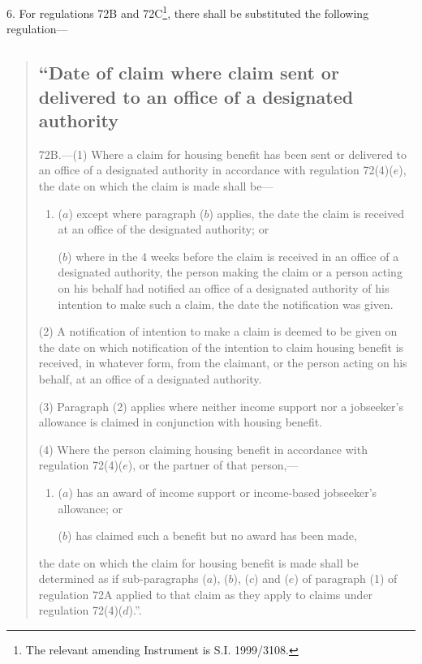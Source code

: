 \documentclass[12pt,a4paper]{article}
\begin{document}
6.  For regulations 72B and 72C\footnote{\frenchspacing The relevant amending Instrument is S.I. 1999/3108.}, there shall be substituted the following regulation—
\begin{quotation}
\subsection*{“Date of claim where claim sent or delivered to an office of a designated authority}

72B.---(1)  Where a claim for housing benefit has been sent or delivered to an office of a designated authority in accordance with regulation 72(4)($e$), the date on which the claim is made shall be—
\begin{enumerate}\item[]
($a$) except where paragraph ($b$)  applies, the date the claim is received at an office of the designated authority; or

($b$) where in the 4 weeks before the claim is received in an office of a designated authority, the person making the claim or a person acting on his behalf had notified an office of a designated authority of his intention to make such a claim, the date the notification was given.
\end{enumerate}

(2) A notification of intention to make a claim is deemed to be given on the date on which notification of the intention to claim housing benefit is received, in whatever form, from the claimant, or the person acting on his behalf, at an office of a designated authority.

(3) Paragraph (2) applies where neither income support nor a jobseeker’s allowance is claimed in conjunction with housing benefit.

(4) Where the person claiming housing benefit in accordance with regulation 72(4)($e$), or the partner of that person,—
\begin{enumerate}\item[]
($a$) has an award of income support or income-based jobseeker’s allowance; or

($b$) has claimed such a benefit but no award has been made,
\end{enumerate}
the date on which the claim for housing benefit is made shall be determined as if sub-paragraphs ($a$), ($b$), ($c$)  and ($e$)  of paragraph (1) of regulation 72A applied to that claim as they apply to claims under regulation 72(4)($d$).”.
\end{quotation}
\end{document}
